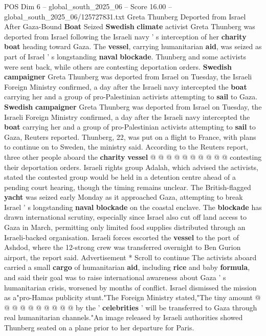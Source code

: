 \begin{textsample}{POS Dim 6 – global\_south\_2025\_06 – Score 16.00 – global\_south\_2025\_06/125727831.txt}  \label{ex:f6_pos_008}
Greta Thunberg Deported from Israel After Gaza-Bound \textbf{Boat} Seized \textbf{Swedish} \textbf{climate} activist Greta Thunberg was deported from Israel following the Israeli navy ' s interception of her \textbf{charity} \textbf{boat} heading toward Gaza.
The \textbf{vessel}, carrying humanitarian \textbf{aid}, was seized as part of Israel ' s longstanding \textbf{naval} \textbf{blockade}.
Thunberg and some activists were sent back, while others are contesting deportation orders. \textbf{Swedish} \textbf{campaigner} Greta Thunberg was deported from Israel on Tuesday, the Israeli Foreign Ministry confirmed, a day after the Israeli navy intercepted the \textbf{boat} carrying her and a group of pro-Palestinian activists attempting to \textbf{sail} to Gaza. \textbf{Swedish} \textbf{campaigner} Greta Thunberg was deported from Israel on Tuesday, the Israeli Foreign Ministry confirmed, a day after the Israeli navy intercepted the \textbf{boat} carrying her and a group of pro-Palestinian activists attempting to \textbf{sail} to Gaza, Reuters reported.
Thunberg, 22, was put on a flight to France, with plans to continue on to Sweden, the ministry said.
According to the Reuters report, three other people aboard the \textbf{charity} \textbf{vessel} @ @ @ @ @ @ @ @ @ @ contesting their deportation orders.
Israeli rights group Adalah, which advised the activists, stated the contested group would be held in a detention centre ahead of a pending court hearing, though the timing remains unclear.
The British-flagged \textbf{yacht} was seized early Monday as it approached Gaza, attempting to break Israel ' s longstanding \textbf{naval} \textbf{blockade} on the coastal enclave.
The \textbf{blockade} has drawn international scrutiny, especially since Israel also cut off land access to Gaza in March, permitting only limited food supplies distributed through an Israeli-backed organisation.
Israeli forces escorted the \textbf{vessel} to the port of Ashdod, where the 12-strong crew was transferred overnight to Ben Gurion airport, the report said.
Advertisement * Scroll to continue The activists aboard carried a small \textbf{cargo} of humanitarian \textbf{aid}, including \textbf{rice} and baby \textbf{formula}, and said their goal was to raise international awareness about Gaza ' s humanitarian crisis, worsened by months of conflict.
Israel dismissed the mission as a"pro-Hamas publicity stunt."The Foreign Ministry stated,"The tiny amount @ @ @ @ @ @ @ @ @ @ by the ' \textbf{celebrities} ' will be transferred to Gaza through real humanitarian channels."An image released by Israeli authorities showed Thunberg seated on a plane prior to her departure for Paris.

\end{textsample}
